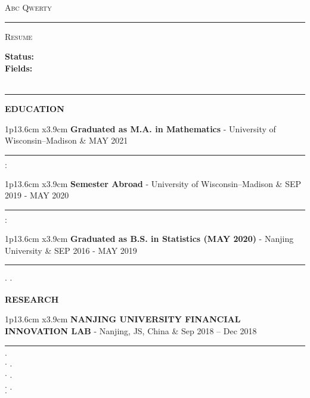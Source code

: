 \documentclass[11pt,A4]{article}
\newcommand{\cvsection}[1]
{
	\begin{center}
		\large\textcolor{sectcol}{\textbf{#1}}
	\end{center}
}
\newcommand{\metasection}[2]
{
\footnotesize{#2} \hspace*{\fill} \footnotesize{#1}\\[1pt]
}
\newcommand{\cvevent}[3]
{

\begin{tabular*}{1\textwidth}{p{13.6cm}  x{3.9cm}}
	\textbf{#2} - \textcolor{bgcol}{#3} &   \vspace{2.5pt}\textcolor{sectcol}{#1}
\end{tabular*}

\vspace{-8pt}
\textcolor{softcol}{\hrule}
\vspace{6pt}


}
\begin{document}
\pagestyle{fancy}
\vspace{-8pt}
\begin{center}
    \HUGE   \textsc{Abc Qwerty}
            \textcolor{sectcol}{\rule[-1mm]{1mm}{0.9cm}}
            \textsc{Resume}\\[2pt]
	\small  \randomstring
\end{center}

\vspace{6pt}

\metasection{\randomstring}{\textbf{Status:} \randomstring}
\metasection{\randomstring}{\textbf{Fields:} \randomstring} 
\metasection{\randomstring}{}
\vspace{-2pt}
\textcolor{softcol}{\hrule}
\vspace{6pt}

\normalsize



\cvsection{EDUCATION}

\cvevent{MAY 2021}
        {Graduated as M.A. in Mathematics}
        {University of Wisconsin–Madison}

        $\cdot$ \randomstring\\
        $\cdot$ \randomstring \\

\cvevent{SEP 2019 - MAY 2020}
        {Semester Abroad}
        {University of Wisconsin–Madison}
        $\cdot$ \randomstring\\
        $\cdot$ \randomstring \\

\cvevent{SEP 2016 - MAY 2019}
        {Graduated as B.S. in Statistics (MAY 2020)}
        {Nanjing University}

        $\cdot$ \randomstring
        $\cdot$ \randomstring\\


\cvsection{RESEARCH}

\cvevent{Sep 2018 – Dec 2018}
        {NANJING UNIVERSITY FINANCIAL INNOVATION LAB}
        {Nanjing, JS, China}

        $\cdot$ \randomstring\\
        $\cdot$ \randomstring.\\
        $\cdot$ \randomstring.\\
        $\cdot$ \randomstring.\\
        $\cdot$ \randomstring\\
\end{document}
